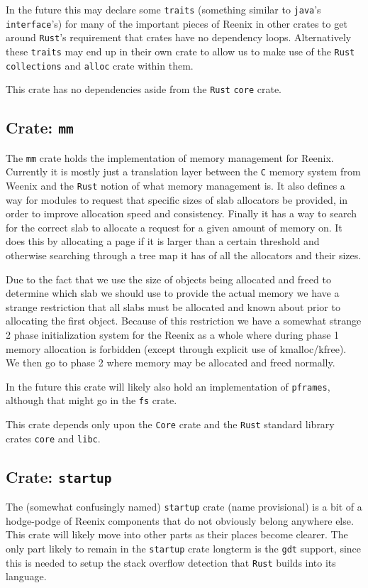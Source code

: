 \documentclass[12pt,letterpaper]{article}
\newcommand{\rust}{\texttt{Rust}}
\begin{document}
In the future this may declare some \texttt{traits} (something similar to
\texttt{java}'s \texttt{interface}'s) for many of the important pieces
of Reenix in other crates to get around \rust{}'s requirement that
crates have no dependency loops. Alternatively these \texttt{traits}
may end up in their own crate to allow us to make use of the \rust{}
\texttt{collections} and \texttt{alloc} crate within them.

This crate has no dependencies aside from the \rust{} \texttt{core} crate.

\subsection{Crate: \texttt{mm}}
The \texttt{mm} crate holds the implementation of memory management
for Reenix. Currently it is mostly just a translation layer between the
\texttt{C} memory system from Weenix and the \rust{} notion of what memory
management is. It also defines a way for modules to request that specific
sizes of slab allocators be provided, in order to improve allocation speed
and consistency. Finally it has a way to search for the correct slab
to allocate a request for a given amount of memory on. It does this by
allocating a page if it is larger than a certain threshold and otherwise
searching through a tree map it has of all the allocators and their sizes.

Due to the fact that we use the size of objects being allocated and freed
to determine which slab we should use to provide the actual memory we
have a strange restriction that all slabs must be allocated and known
about prior to allocating the first object. Because of this restriction
we have a somewhat strange 2 phase initialization system for the Reenix
as a whole where during phase 1 memory allocation is forbidden (except
through explicit use of kmalloc/kfree). We then go to phase 2 where
memory may be allocated and freed normally.

In the future this crate will likely also hold an implementation of
\texttt{pframes}, although that might go in the \texttt{fs} crate.

This crate depends only upon the \texttt{Core} crate and the \rust{}
standard library crates \texttt{core} and \texttt{libc}.

\subsection{Crate: \texttt{startup}}
The (somewhat confusingly named) \texttt{startup} crate (name provisional)
is a bit of a hodge-podge of Reenix components that do not obviously
belong anywhere else. This crate will likely move into other parts
as their places become clearer. The only part likely to remain in the
\texttt{startup} crate longterm is the \texttt{gdt} support, since this
is needed to setup the stack overflow detection that \rust{} builds into
its language.
\end{document}
